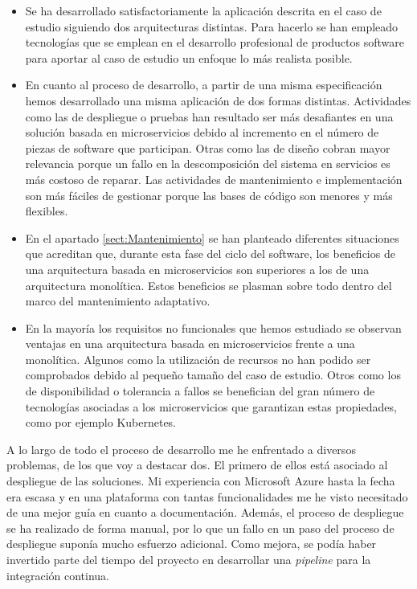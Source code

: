 \documentclass[11pt,spanish,listoffigures]{tfgetsinf}
\begin{document}
\begin{itemize}

\item Se ha desarrollado satisfactoriamente la aplicación descrita en el caso de estudio siguiendo dos arquitecturas distintas. Para hacerlo se han empleado tecnologías que se emplean en el desarrollo profesional de productos software para aportar al caso de estudio un enfoque lo más realista posible.

\item En cuanto al proceso de desarrollo, a partir de una misma especificación hemos desarrollado una misma aplicación de dos formas distintas. Actividades como las de despliegue o pruebas han resultado ser más desafiantes en una solución basada en microservicios debido al incremento en el número de piezas de software que participan. Otras como las de diseño cobran mayor relevancia porque un fallo en la descomposición del sistema en servicios es más costoso de reparar. Las actividades de mantenimiento e implementación son más fáciles de gestionar porque las bases de código son menores y más flexibles.

\item En el apartado \ref{sect:Mantenimiento}  se han planteado diferentes situaciones que acreditan que, durante esta fase del ciclo del software, los beneficios de una arquitectura basada en microservicios son superiores a los de una arquitectura monolítica. Estos beneficios se plasman sobre todo dentro del marco del mantenimiento adaptativo.

\item En la mayoría los requisitos no funcionales que hemos estudiado se observan ventajas en una arquitectura basada en microservicios frente a una monolítica. Algunos como la utilización de recursos no han podido ser comprobados debido al pequeño tamaño del caso de estudio. Otros como los de disponibilidad o tolerancia a fallos se benefician del gran número de tecnologías asociadas a los microservicios que garantizan estas propiedades, como por ejemplo Kubernetes.

\end{itemize}

A lo largo de todo el proceso de desarrollo me he enfrentado a diversos problemas, de los que voy a destacar dos. El primero de ellos está asociado al despliegue de las soluciones. Mi experiencia con Microsoft Azure hasta la fecha era escasa y en una plataforma con tantas funcionalidades me he visto necesitado de una mejor guía en cuanto a documentación. Además, el proceso de despliegue se ha realizado de forma manual, por lo que un fallo en un paso del proceso de despliegue suponía mucho esfuerzo adicional. Como mejora, se podía haber invertido parte del tiempo del proyecto en desarrollar una \textit{pipeline} para la integración continua.
\end{document}
